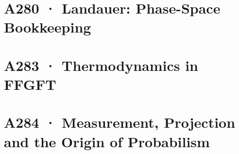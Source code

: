 \documentclass[11pt,twoside,openright]{book}
\begin{document}
\chapter[A280 · Phase-Space Bookkeeping (extended)]{A280 · Landauer: Phase-Space Bookkeeping}


\chapter[A283 · Thermodynamics in FFGFT]{A283 · Thermodynamics in FFGFT}


\chapter[A284 · Measurement, Projection and Probabilism]{A284 · Measurement, Projection and the Origin of Probabilism}


\end{document}
